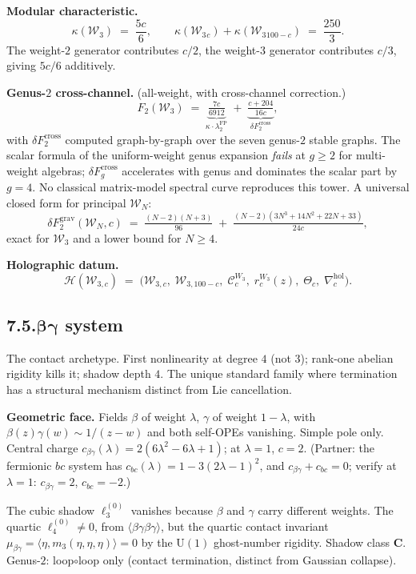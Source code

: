\documentclass[11pt,reqno]{amsart}
\theoremstyle{definition}
\theoremstyle{remark}
\providecommand{\cC}{\mathcal{C}}
\providecommand{\cH}{\mathcal{H}}
\providecommand{\cW}{\mathcal{W}}
\providecommand{\hol}{\mathrm{hol}}
\providecommand{\FP}{\mathrm{FP}}
\providecommand{\cross}{\mathrm{cross}}
\providecommand{\FP}{\mathrm{FP}}
\providecommand{\cross}{\mathrm{cross}}
\providecommand{\grav}{\mathrm{grav}}
\numberwithin{equation}{section}
\begin{document}
\medskip\noindent\textbf{Modular characteristic.}
\[
\kappa(\cW_3) \;=\; \frac{5c}{6},
\qquad
\kappa(\cW_3{}_c) + \kappa(\cW_3{}_{100-c})
\;=\; \frac{250}{3}.
\]
The weight-$2$ generator contributes $c/2$, the weight-$3$
generator contributes $c/3$, giving $5c/6$ additively.

\medskip\noindent\textbf{Genus-$2$ cross-channel.} (all-weight,
with cross-channel correction.)
\begin{equation}\label{eq:w3-genus2-b}
F_2(\cW_3)
\;=\;
\underbrace{\tfrac{7c}{6912}}_{\kappa\cdot\lambda_2^{\FP}}
\;+\;
\underbrace{\tfrac{c+204}{16c}}_{\delta F_2^{\cross}},
\end{equation}
with $\delta F_2^{\cross}$ computed graph-by-graph over the
seven genus-$2$ stable graphs. The scalar formula of the
uniform-weight genus expansion \emph{fails} at $g \ge 2$
for multi-weight algebras; $\delta F_g^{\cross}$ accelerates
with genus and dominates the scalar part by $g = 4$. No
classical matrix-model spectral curve reproduces this tower.
A universal closed form for principal $\cW_N$:
\[
\delta F_2^{\grav}(\cW_N, c)
\;=\;
\tfrac{(N-2)(N+3)}{96}
\;+\;
\tfrac{(N-2)(3N^3 + 14N^2 + 22N + 33)}{24c},
\]
exact for $\cW_3$ and a lower bound for $N \ge 4$.

\medskip\noindent\textbf{Holographic datum.}
\[
\cH(\cW_{3,c})
\;=\;
\bigl(
\cW_{3,c},\;
\cW_{3,100-c},\;
\cC_c^{W_3},\;
r_c^{W_3}(z),\;
\Theta_c,\;
\nabla^{\hol}_c
\bigr).
\]

\subsection*{7.5.\quad $\boldsymbol{\beta\gamma}$ system}

The contact archetype. First nonlinearity at degree $4$ (not $3$);
rank-one abelian rigidity kills it; shadow depth $4$. The unique
standard family where termination has a structural mechanism
distinct from Lie cancellation.

\medskip\noindent\textbf{Geometric face.} Fields $\beta$ of
weight $\lambda$, $\gamma$ of weight $1-\lambda$, with
$\beta(z)\gamma(w) \sim 1/(z-w)$ and both self-OPEs vanishing.
Simple pole only. Central charge
$c_{\beta\gamma}(\lambda) = 2(6\lambda^2 - 6\lambda + 1)$; at
$\lambda = 1$, $c = 2$. (Partner: the fermionic $bc$ system has
$c_{bc}(\lambda) = 1 - 3(2\lambda - 1)^2$, and
$c_{\beta\gamma} + c_{bc} = 0$; verify at $\lambda = 1$:
$c_{\beta\gamma} = 2$, $c_{bc} = -2$.)

The cubic shadow $\ell_3^{(0)}$ vanishes because $\beta$ and
$\gamma$ carry different weights. The quartic
$\ell_4^{(0)} \neq 0$, from $\langle\beta\gamma\beta\gamma\rangle$,
but the quartic contact invariant
$\mu_{\beta\gamma} = \langle\eta, m_3(\eta,\eta,\eta)\rangle = 0$
by the $\mathrm{U}(1)$ ghost-number rigidity. Shadow class
$\mathbf C$. Genus-$2$: loop$\circ$loop only (contact
termination, distinct from Gaussian collapse).
\end{document}
